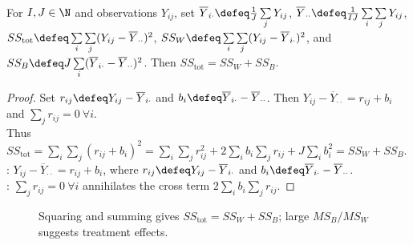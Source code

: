\begin{proposition} \label{prop:one-way-sums-of-squares-decomposition} \\
For $I,J\in\N$ and observations $Y_{ij}$, set $\overline{Y}_{i\cdot}\defeq \frac{1}{J}\sum\limits_jY_{ij}$, $\overline{Y}_{\cdot\cdot}\defeq \frac{1}{IJ}\sum\limits_i\sum\limits_jY_{ij}$,\\
$SS_{\mathrm{tot}}\defeq\sum\limits_i\sum\limits_j(Y_{ij}-\overline{Y}_{\cdot\cdot})^2$, $SS_W\defeq\sum\limits_i\sum\limits_j(Y_{ij}-\overline{Y}_{i\cdot})^2$, and $SS_B\defeq J\sum\limits_i(\overline{Y}_{i\cdot}-\overline{Y}_{\cdot\cdot})^2$. Then $SS_{\mathrm{tot}}=SS_W+SS_B$.
\begin{proof}
Set $r_{ij}\defeq Y_{ij}-\overline{Y}_{i\cdot}$ and $b_i\defeq \overline{Y}_{i\cdot}-\overline{Y}_{\cdot\cdot}$. Then $Y_{ij}-\overline{Y}_{\cdot\cdot}=r_{ij}+b_i$ and $\sum\limits_jr_{ij}=0\ \forall i$.\\
Thus $SS_{\mathrm{tot}}=\sum\limits_i\sum\limits_j(r_{ij}+b_i)^2=\sum\limits_i\sum\limits_jr_{ij}^2+2\sum\limits_i b_i\sum\limits_jr_{ij}+J\sum\limits_i b_i^2=SS_W+SS_B$.\\
: $Y_{ij}-\overline{Y}_{\cdot\cdot}=r_{ij}+b_i$, where $r_{ij}\defeq Y_{ij}-\overline{Y}_{i\cdot}$ and $b_i\defeq\overline{Y}_{i\cdot}-\overline{Y}_{\cdot\cdot}$.\\
: $\sum\limits_jr_{ij}=0\ \forall i$ annihilates the cross term $2\sum\limits_i b_i\sum\limits_jr_{ij}$.
\end{proof}
\end{proposition}

\begin{figure}[H]
  \centering
  
  \caption{Squaring and summing gives $SS_{\mathrm{tot}}=SS_W+SS_B$; large $MS_B/MS_W$ suggests treatment effects.}
  \label{fig:anova-sums-of-squares-decomposition}
\end{figure}

